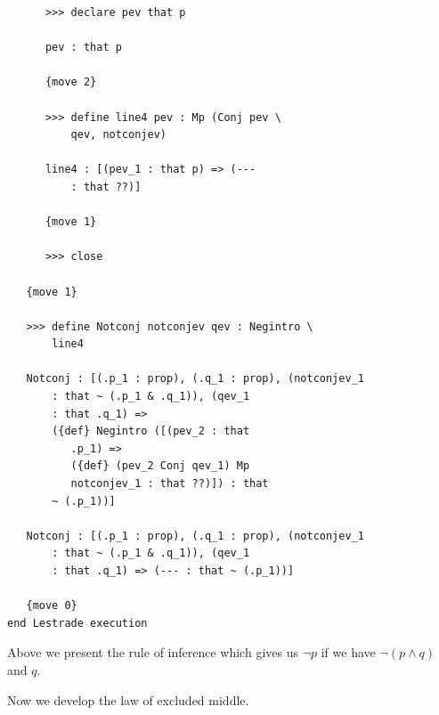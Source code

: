 \documentclass[12pt]{article}
\begin{document}
\begin{verbatim}
      >>> declare pev that p

      pev : that p

      {move 2}

      >>> define line4 pev : Mp (Conj pev \
          qev, notconjev)

      line4 : [(pev_1 : that p) => (--- 
          : that ??)]

      {move 1}

      >>> close

   {move 1}

   >>> define Notconj notconjev qev : Negintro \
       line4

   Notconj : [(.p_1 : prop), (.q_1 : prop), (notconjev_1 
       : that ~ (.p_1 & .q_1)), (qev_1 
       : that .q_1) => 
       ({def} Negintro ([(pev_2 : that 
          .p_1) => 
          ({def} (pev_2 Conj qev_1) Mp 
          notconjev_1 : that ??)]) : that 
       ~ (.p_1))]

   Notconj : [(.p_1 : prop), (.q_1 : prop), (notconjev_1 
       : that ~ (.p_1 & .q_1)), (qev_1 
       : that .q_1) => (--- : that ~ (.p_1))]

   {move 0}
end Lestrade execution
\end{verbatim}

Above we present the rule of inference which gives us $\neg p$ if we have $\neg(p \wedge q)$ and $q$.

Now we develop the law of excluded middle.
\end{document}
